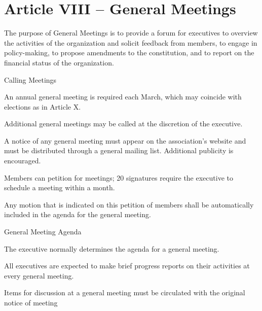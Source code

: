 \documentclass[12pt,a4paper]{article}
\begin{document}
\section{Article VIII – General Meetings}

\begin{constitutionlist}
\item The purpose of General Meetings is to provide a forum for executives to overview the activities of the organization and solicit feedback from members, to engage in policy-making, to propose amendments to the constitution, and to report on the financial status of the organization.

\item Calling Meetings

\begin{constitutionlist}
\item An annual general meeting is required each March, which may coincide with elections as in Article X.

\item Additional general meetings may be called at the discretion of the executive.

\item A notice of any general meeting must appear on the association's website and must be distributed through a general mailing list. Additional publicity is encouraged.

\item Members can petition for meetings; 20 signatures require the executive to schedule a meeting within a month. 

\item Any motion that is indicated on this petition of members shall be automatically included in the agenda for the general meeting.
\end{constitutionlist}

\item General Meeting Agenda

\begin{constitutionlist}
\item The executive normally determines the agenda for a general meeting.

\item All executives are expected to make brief progress reports on their activities at every general meeting.

\item Items for discussion at a general meeting must be circulated with the original notice of meeting


\end{constitutionlist}
\end{constitutionlist}
\end{document}
